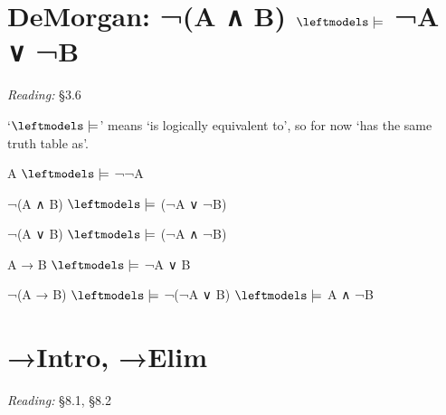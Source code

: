 \documentclass[12pt]{extarticle}
\begin{document}
\begin{multicols*}{3}
 
\section{DeMorgan: ¬(A ∧ B) $\leftmodels\models$ ¬A ∨ ¬B}
 
\emph{Reading:} §3.6
 
`$\leftmodels\models$' means `is logically equivalent to', so for now `has the same truth table as'.
 
A $\leftmodels\models$ ¬¬A
 
¬(A ∧ B) $\leftmodels\models$ (¬A ∨ ¬B)
 
¬(A ∨ B) $\leftmodels\models$ (¬A ∧ ¬B)
 
A → B $\leftmodels\models$ ¬A ∨ B
 
¬(A → B) $\leftmodels\models$ ¬(¬A ∨ B) $\leftmodels\models$ A ∧ ¬B
 



 
\vfill



\section{→Intro, →Elim}
 
\emph{Reading:} §8.1, §8.2
 

\end{multicols*}
\end{document}

